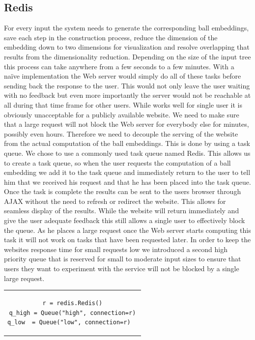 \documentclass[]{article}
\begin{document}
\subsection{Redis}
\label{sec::redis}
For every input the system needs to generate the corresponding ball embeddings, save each step in the construction process, reduce the dimension of the embedding down to two dimensions for visualization and resolve overlapping that results from the dimensionality reduction. Depending on the size of the input tree this process can take anywhere from a few seconds to a few minutes. With a naïve implementation the Web server would simply do all of these tasks before sending back the response to the user. This would not only leave the user waiting with no feedback but even more importantly the server would not be reachable at all during that time frame for other users. While works well for single user it is obviously unacceptable for a publicly available website. We need to make sure that a large request will not block the Web server for everybody else for minutes, possibly even hours. Therefore we need to decouple the serving of the website from the actual computation of the ball embeddings. This is done by using a task queue.
We chose to use a commonly used task queue named Redis. This allows us to create a task queue, so when the user requests the computation of a ball embedding we add it to the task queue and immediately return to the user to tell him that we received his request and that he has been placed into the task queue. Once the task is complete the results can be sent to the users browser through AJAX without the need to refresh or redirect the website. This allows for seamless display of the results. While the website will return immediately and give the user adequate feedback this still allows a single user to effectively block the queue. As he places a large request once the Web server starts computing this task it will not work on tasks that have been requested later. In order to keep the websites response time for small requests low we introduced a second high priority queue that is reserved for small to moderate input sizes to ensure that users they want to experiment with the service will not be blocked by a single large request.
\begin{center}


\begin{tabular}{c}
\begin{lstlisting}
r = redis.Redis()
q_high = Queue("high", connection=r)
q_low  = Queue("low", connection=r)  
\end{lstlisting}
\end{tabular}
\end{center}
\end{document}
